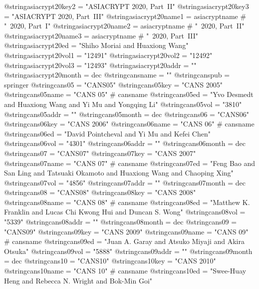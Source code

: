 @string{asiacrypt20key2 =       "ASIACRYPT 2020, Part~II"}
@string{asiacrypt20key3 =       "ASIACRYPT 2020, Part~III"}
@string{asiacrypt20name1 =      asiacryptname # "~2020, Part~I"}
@string{asiacrypt20name2 =      asiacryptname # "~2020, Part~II"}
@string{asiacrypt20name3 =      asiacryptname # "~2020, Part~III"}
@string{asiacrypt20ed =         "Shiho Moriai and Huaxiong Wang"}
@string{asiacrypt20vol1 =       "12491"}
@string{asiacrypt20vol2 =       "12492"}
@string{asiacrypt20vol3 =       "12493"}
@string{asiacrypt20addr =       ""}
@string{asiacrypt20month =      dec}
@string{cansname =              ""}
@string{canspub =               springer}
@string{cans05 =                "CANS05"}
@string{cans05key =             "CANS 2005"}
@string{cans05name =            "CANS 05" # cansname}
@string{cans05ed =              "Yvo Desmedt and Huaxiong Wang and Yi Mu and Yongqing Li"}
@string{cans05vol =             "3810"}
@string{cans05addr =            ""}
@string{cans05month =           dec}
@string{cans06 =                "CANS06"}
@string{cans06key =             "CANS 2006"}
@string{cans06name =            "CANS 06" # cansname}
@string{cans06ed =              "David Pointcheval and Yi Mu and Kefei Chen"}
@string{cans06vol =             "4301"}
@string{cans06addr =            ""}
@string{cans06month =           dec}
@string{cans07 =                "CANS07"}
@string{cans07key =             "CANS 2007"}
@string{cans07name =            "CANS 07" # cansname}
@string{cans07ed =              "Feng Bao and San Ling and Tatsuaki Okamoto and Huaxiong Wang and Chaoping Xing"}
@string{cans07vol =             "4856"}
@string{cans07addr =            ""}
@string{cans07month =           dec}
@string{cans08 =                "CANS08"}
@string{cans08key =             "CANS 2008"}
@string{cans08name =            "CANS 08" # cansname}
@string{cans08ed =              "Matthew K. Franklin and Lucas Chi Kwong Hui and Duncan S. Wong"}
@string{cans08vol =             "5339"}
@string{cans08addr =            ""}
@string{cans08month =           dec}
@string{cans09 =                "CANS09"}
@string{cans09key =             "CANS 2009"}
@string{cans09name =            "CANS 09" # cansname}
@string{cans09ed =              "Juan A. Garay and Atsuko Miyaji and Akira Otsuka"}
@string{cans09vol =             "5888"}
@string{cans09addr =            ""}
@string{cans09month =           dec}
@string{cans10 =                "CANS10"}
@string{cans10key =             "CANS 2010"}
@string{cans10name =            "CANS 10" # cansname}
@string{cans10ed =              "Swee-Huay Heng and Rebecca N. Wright and Bok-Min Goi"}
